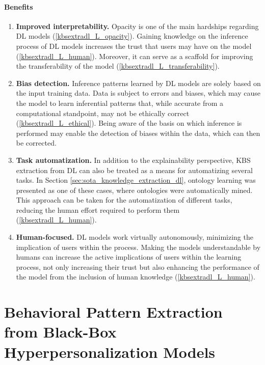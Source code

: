 \paragraph{Benefits}
\begin{enumerate} [start=1,label={\bfseries B\arabic*.}]
    \item \textbf{Improved interpretability.}\label{kbsextradl_B_interpretability} Opacity is one of the main hardships regarding DL models (\ref{kbsextradl_L_opacity}). Gaining knowledge on the inference process of DL models increases the trust that users may have on the model (\ref{kbsextradl_L_human}). Moreover, it can serve as a scaffold for improving the transferability of the model (\ref{kbsextradl_L_transferability}).
    
    \item \textbf{Bias detection.}\label{kbsextradl_B_bias} Inference patterns learned by DL models are solely based on the input training data. Data is subject to errors and biases, which may cause the model to learn inferential patterns that, while accurate from a computational standpoint, may not be ethically correct (\ref{kbsextradl_L_ethical}). Being aware of the basis on which inference is performed may enable the detection of biases within the data, which can then be corrected.
    
    \item \textbf{Task automatization.}\label{kbsextradl_B_automatization} In addition to the explainability perspective, KBS extraction from DL can also be treated as a means for automatizing several tasks. In Section \ref{sec:sota_knowledge_extraction_dl}, ontology learning was presented as one of these cases, where ontologies were automatically mined. This approach can be taken for the automatization of different tasks, reducing the human effort required to perform them (\ref{kbsextradl_L_human}).
    
    \item \textbf{Human-focused.}\label{kbsextradl_B_human} DL models work virtually autonomously, minimizing the implication of users within the process. Making the models understandable by humans can increase the active implications of users within the learning process, not only increasing their trust but also enhancing the performance of the model from the inclusion of human knowledge (\ref{kbsextradl_L_human}). 
\end{enumerate}
\section{Behavioral Pattern Extraction from Black-Box Hyperpersonalization Models}\label{6_sec:mas_bbhos_general}

